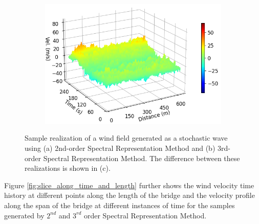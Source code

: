 \documentclass[preprint, review, 12pt]{elsarticle}
\begin{document}
\begin{figure}[!ht]
\begin{subfigure}{0.50\textwidth}
  \includegraphics[width=0.8\linewidth]{plots/sample_diff.png}
  \label{fig:sample_diff}
  \caption{}
 \end{subfigure}
\caption{Sample realization of a wind field generated as a stochastic wave using (a) 2nd-order Spectral Representation Method and (b) 3rd-order Spectral Representation Method. The difference between these realizations is shown in (c).}
\label{fig:sample_plots}
\end{figure}
Figure \ref{fig:slice_along_time_and_length} further shows the wind velocity time history at different points along the length of the bridge and the velocity profile along the span of the bridge at different instances of time for the samples generated by $2^{nd}$ and $3^{rd}$ order Spectral Representation Method.
\end{document}
